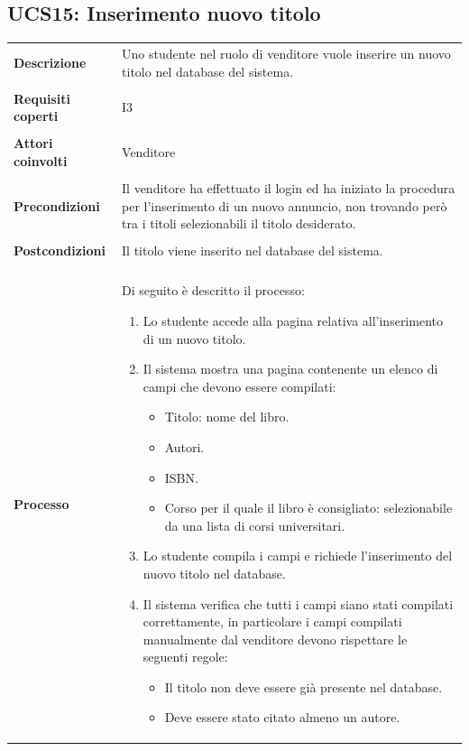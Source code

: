 \documentclass[10pt,a4paper]{report}
\begin{document}
	\subsection{UCS15: Inserimento nuovo titolo}
	\begin{tabular}{lp{}}
		\textbf{Descrizione}&Uno studente nel ruolo di venditore vuole inserire un nuovo titolo nel database del sistema.\\
		\\
		\textbf{Requisiti coperti}&I3\\
		\\
		\textbf{Attori coinvolti}&Venditore\\
		\\
		\textbf{Precondizioni}&Il venditore ha effettuato il login ed ha iniziato la procedura per l'inserimento di un nuovo annuncio, non trovando però tra i titoli selezionabili il titolo desiderato.\\
		\\
		\textbf{Postcondizioni}&Il titolo viene inserito nel database del sistema.\\
		\\
		\textbf{Processo}&Di seguito è descritto il processo:
		\begin{enumerate}
			\item Lo studente accede alla pagina relativa all'inserimento di un nuovo titolo.
			\item Il sistema mostra una pagina contenente un elenco di campi che devono essere compilati:
			\begin{itemize}
				\item Titolo: nome del libro.
				\item Autori.
				\item ISBN.
				\item Corso per il quale il libro è consigliato: selezionabile da una lista di corsi universitari.
			\end{itemize}
			\item Lo studente compila i campi e richiede l'inserimento del nuovo titolo nel database.
			\item Il sistema verifica che tutti i campi siano stati compilati correttamente, in particolare i campi compilati manualmente dal venditore devono rispettare le seguenti regole:
			\begin{itemize}
				\item Il titolo non deve essere già presente nel database.
				\item Deve essere stato citato almeno un autore.

\end{itemize}
\end{enumerate}
\end{tabular}
\end{document}
